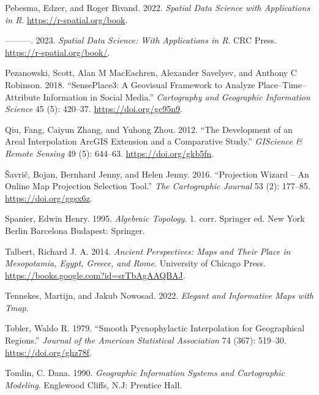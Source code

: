 \documentclass[
  letterpaper,
]{krantz}
\newlength{\cslhangindent}
\newenvironment{CSLReferences}[2] %
 {\begin{list}{}{%
  \setlength{\itemindent}{0pt}
  \setlength{\leftmargin}{0pt}
  \setlength{\parsep}{0pt}
  \ifodd #1
   \setlength{\leftmargin}{\cslhangindent}
   \setlength{\itemindent}{-1\cslhangindent}
  \fi
  \setlength{\itemsep}{#2\baselineskip}}}
 {\end{list}}
\begin{document}
\begin{CSLReferences}{1}{0}
Pebesma, Edzer, and Roger Bivand. 2022. \emph{Spatial {Data Science}
with Applications in {R}}. \url{https://r-spatial.org/book}.

---------. 2023. \emph{Spatial {Data Science}: {With Applications} in
{R}}. {CRC Press}. \url{https://r-spatial.org/book/}.

Pezanowski, Scott, Alan M MacEachren, Alexander Savelyev, and Anthony C
Robinson. 2018. {``{SensePlace3}: A Geovisual Framework to Analyze
Place--Time--Attribute Information in Social Media.''} \emph{Cartography
and Geographic Information Science} 45 (5): 420--37.
\url{https://doi.org/gc95n9}.

Qiu, Fang, Caiyun Zhang, and Yuhong Zhou. 2012. {``The {Development} of
an {Areal Interpolation ArcGIS Extension} and a {Comparative Study}.''}
\emph{GIScience \& Remote Sensing} 49 (5): 644--63.
\url{https://doi.org/gkb5fn}.

Šavrič, Bojan, Bernhard Jenny, and Helen Jenny. 2016. {``Projection
{Wizard} -- {An Online Map Projection Selection Tool}.''} \emph{The
Cartographic Journal} 53 (2): 177--85. \url{https://doi.org/ggsx6z}.

Spanier, Edwin Henry. 1995. \emph{Algebraic Topology}. 1. corr. Springer
ed. {New York Berlin Barcelona Budapest}: {Springer}.

Talbert, Richard J. A. 2014. \emph{Ancient {Perspectives}: {Maps} and
{Their Place} in {Mesopotamia}, {Egypt}, {Greece}, and {Rome}}.
{University of Chicago Press}.
\url{https://books.google.com?id=srTbAgAAQBAJ}.

Tennekes, Martijn, and Jakub Nowosad. 2022. \emph{Elegant and
Informative Maps with Tmap}.

Tobler, Waldo R. 1979. {``Smooth {Pycnophylactic Interpolation} for
{Geographical Regions}.''} \emph{Journal of the American Statistical
Association} 74 (367): 519--30. \url{https://doi.org/ghz78f}.

Tomlin, C. Dana. 1990. \emph{Geographic Information Systems and
Cartographic Modeling}. {Englewood Cliffs, N.J}: {Prentice Hall}.


\end{CSLReferences}
\end{document}
